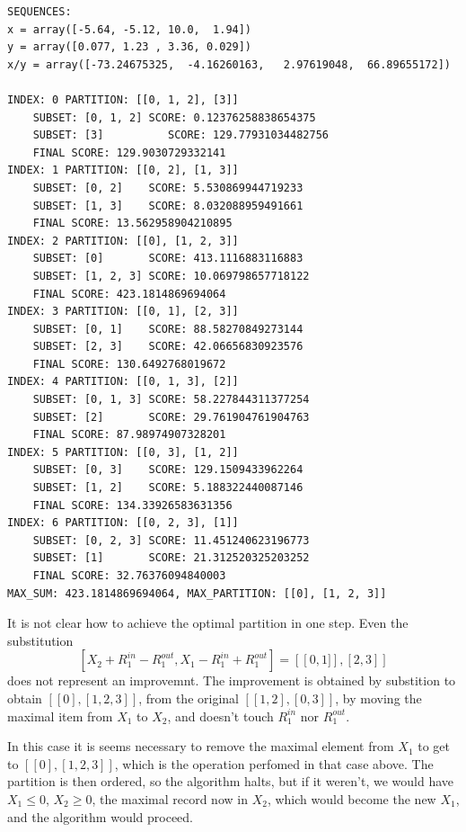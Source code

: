 \documentclass{article}
\theoremstyle{case}
\begin{document}
\begin{verbatim}
SEQUENCES:
x = array([-5.64, -5.12, 10.0,  1.94])
y = array([0.077, 1.23 , 3.36, 0.029])
x/y = array([-73.24675325,  -4.16260163,   2.97619048,  66.89655172])

INDEX: 0 PARTITION: [[0, 1, 2], [3]]
    SUBSET: [0, 1, 2] SCORE: 0.12376258838654375
    SUBSET: [3] 		 SCORE: 129.77931034482756
    FINAL SCORE: 129.9030729332141
INDEX: 1 PARTITION: [[0, 2], [1, 3]]
    SUBSET: [0, 2]    SCORE: 5.530869944719233
    SUBSET: [1, 3]    SCORE: 8.032088959491661
    FINAL SCORE: 13.562958904210895
INDEX: 2 PARTITION: [[0], [1, 2, 3]]
	SUBSET: [0]       SCORE: 413.1116883116883
    SUBSET: [1, 2, 3] SCORE: 10.069798657718122
    FINAL SCORE: 423.1814869694064
INDEX: 3 PARTITION: [[0, 1], [2, 3]]
    SUBSET: [0, 1]    SCORE: 88.58270849273144
    SUBSET: [2, 3]    SCORE: 42.06656830923576
    FINAL SCORE: 130.6492768019672
INDEX: 4 PARTITION: [[0, 1, 3], [2]]
    SUBSET: [0, 1, 3] SCORE: 58.227844311377254
    SUBSET: [2]       SCORE: 29.761904761904763
    FINAL SCORE: 87.98974907328201
INDEX: 5 PARTITION: [[0, 3], [1, 2]]
    SUBSET: [0, 3]    SCORE: 129.1509433962264
    SUBSET: [1, 2]    SCORE: 5.188322440087146
    FINAL SCORE: 134.33926583631356
INDEX: 6 PARTITION: [[0, 2, 3], [1]]
    SUBSET: [0, 2, 3] SCORE: 11.451240623196773
    SUBSET: [1]       SCORE: 21.312520325203252
    FINAL SCORE: 32.76376094840003
MAX_SUM: 423.1814869694064, MAX_PARTITION: [[0], [1, 2, 3]]

\end{verbatim}



It is not clear how to achieve the optimal partition in one step. Even the substitution
\[
\left[ X_2 + R_1^{in} - R_1^{out}, X_1 - R_1^{in}+R_1^{out} \right] = \left[ \left[0,1] \right], \left[ 2, 3\right] \right]
\]
does not represent an improvemnt. The improvement is obtained by substition to obtain $\left[ \left[ 0 \right], \left[ 1, 2, 3\right]\right]$, from the original $\left[ \left[ 1, 2\right], \left[ 0, 3\right] \right]$, by moving the maximal item from $X_1$ to $X_2$, and doesn't touch $R_1^{in}$ nor $R_1^{out}$.

In this case it is seems necessary to remove the maximal element from $X_1$ to get to $\left[ \left[ 0 \right], \left[ 1, 2, 3\right]\right]$, which is the operation perfomed in that case above. The partition is then ordered, so the algorithm halts, but if it weren't, we would have $X_1 \leq 0$, $X_2 \geq 0$, the maximal record now in $X_2$, which would become the new $X_1$, and the algorithm would proceed. 
\end{document}
